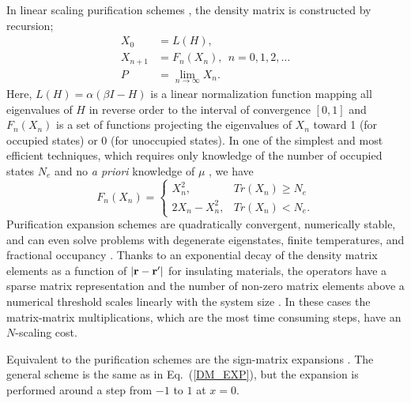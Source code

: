 In linear scaling purification schemes 
\cite{McWeeny60,Clinton69,Palser98,Holas01,NiklassonWLT,NiklassonSP2,NiklassonSP4}, 
the density matrix is constructed by recursion;
\begin{equation}\label{DM_EXP} \begin{array}{ll}
X_0     & = L(H), \\
X_{n+1} & = F_n(X_n), ~~ n = 0,1,2, \ldots\\
P    & = \lim_{n \rightarrow \infty} X_n. \end{array}
\end{equation}
Here, $L(H) = \alpha(\beta I - H)$ is a linear normalization function \cite{Notation}
mapping all eigenvalues of $H$
in reverse order to the interval of convergence $[0,1]$ and $F_{n}(X_n)$ 
is a set of functions projecting the eigenvalues of $X_n$
toward  1 (for occupied states) or 0 (for unoccupied states). In one of 
the simplest and most efficient techniques, which requires only 
knowledge of the number of occupied states $N_e$ and no {\em a priori} 
knowledge of $\mu$ \cite{NiklassonSP2}, we have 
\begin{equation} \label{SP2}
F_{n}(X_n) = 
\left\{\begin{array}{ll}
X_n^2, &  Tr(X_n) \geq N_e \\
2X_n - X_n^2, & Tr(X_n) < N_e.
\end{array} \right.
\end{equation}
Purification expansion schemes are quadratically convergent, numerically 
stable, and can even solve problems with degenerate eigenstates, finite 
temperatures, and fractional occupancy \cite{NiklassonSP4,NiklassonIP}. Thanks to an 
exponential decay of the density matrix elements as a function of $|{\bf r-r'}|$ 
for insulating materials, the operators have a sparse matrix representation 
and the number of non-zero matrix elements above a numerical threshold
scales linearly with the system size \cite{Goedecker_RMP_99,Wu02}.  
In these cases the matrix-matrix multiplications, 
which are the most time consuming steps, have an $N$-scaling cost.

Equivalent to the purification
schemes are the sign-matrix expansions \cite{Kenney91,Beylkin99,Karoly}.
The general scheme is the same as in Eq.\ (\ref{DM_EXP}), but
the expansion is performed around a step from $-1$ to $1$ at $x=0$.

